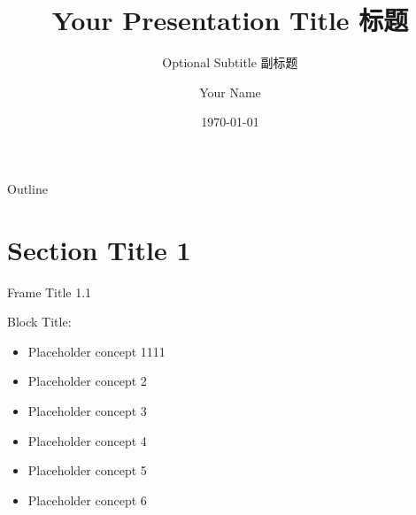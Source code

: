 \documentclass{beamer}
\author{Your Name}
\title{Your Presentation Title 标题}
\subtitle{Optional Subtitle 副标题}
\institute{Your University/Institution 单位/学院}
\date{\today} %
\begin{document}
\begin{frame}
    \titlepage
\end{frame}

\begin{frame}{Outline} %
    \tableofcontents[sectionstyle=show,
    subsectionstyle=show/shaded/hide,
    subsubsectionstyle=show/shaded/hide
    ]
\end{frame}

\section{Section Title 1} %
\begin{frame}{Frame Title 1.1} %
    \begin{block}{Block Title:}
		\begin{itemize}
        \item Placeholder concept 1111
        \item Placeholder concept 2
        \item Placeholder concept 3
        \item Placeholder concept 4
        \item Placeholder concept 5
        \item Placeholder concept 6
    \end{itemize}
	\end{block}
\end{frame}
\end{document}
